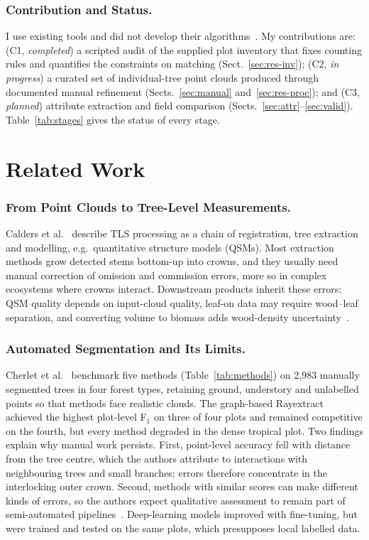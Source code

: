 \documentclass[runningheads]{llncs}
\begin{document}
\subsubsection{Contribution and Status.}
I use existing tools and did not develop their algorithms~\cite{lowe2021,pipeline}. My contributions are: (C1, \emph{completed}) a scripted audit of the supplied plot inventory that fixes counting rules and quantifies the constraints on matching (Sect.~\ref{sec:res-inv}); (C2, \emph{in progress}) a curated set of individual-tree point clouds produced through documented manual refinement (Sects.~\ref{sec:manual} and~\ref{sec:res-proc}); and (C3, \emph{planned}) attribute extraction and field comparison (Sects.~\ref{sec:attr}--\ref{sec:valid}). Table~\ref{tab:stages} gives the status of every stage.

\section{Related Work}\label{sec:related}

\subsubsection{From Point Clouds to Tree-Level Measurements.}
Calders et al.~\cite{calders2020} describe TLS processing as a chain of registration, tree extraction and modelling, e.g.\ quantitative structure models (QSMs). Most extraction methods grow detected stems bottom-up into crowns, and they usually need manual correction of omission and commission errors, more so in complex ecosystems where crowns interact. Downstream products inherit these errors: QSM quality depends on input-cloud quality, leaf-on data may require wood--leaf separation, and converting volume to biomass adds wood-density uncertainty~\cite{calders2020}.

\subsubsection{Automated Segmentation and Its Limits.}
Cherlet et al.~\cite{cherlet2026} benchmark five methods (Table~\ref{tab:methods}) on 2,983 manually segmented trees in four forest types, retaining ground, understory and unlabelled points so that methods face realistic clouds. The graph-based Rayextract achieved the highest plot-level F$_1$ on three of four plots and remained competitive on the fourth, but every method degraded in the dense tropical plot. Two findings explain why manual work persists. First, point-level accuracy fell with distance from the tree centre, which the authors attribute to interactions with neighbouring trees and small branches; errors therefore concentrate in the interlocking outer crown. Second, methods with similar scores can make different kinds of errors, so the authors expect qualitative assessment to remain part of semi-automated pipelines~\cite{cherlet2026}. Deep-learning models improved with fine-tuning, but were trained and tested on the same plots, which presupposes local labelled data.
\end{document}
